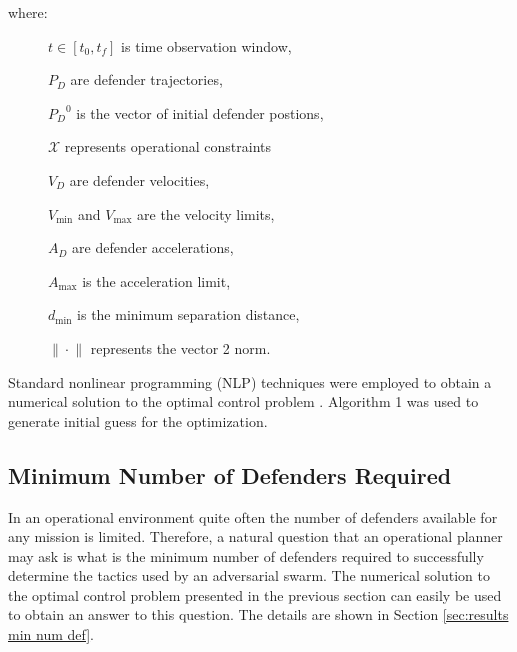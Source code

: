 \documentclass[journal]{IEEEtran} %
\begin{document}
where:

\begin{description}
    \item[] \( t \in [t_0, t_f] \) is time observation window,
    \item[] \( P_D \) are defender trajectories,
    \item[] \( {P_D}^0 \) is the vector of initial defender postions,
    \item[] \( \mathcal{X} \) represents operational constraints
    \item[] \( V_D \) are defender velocities,
    \item[] \( V_{\min} \) and \( V_{\max} \) are the velocity limits,
    \item[] \( A_D \) are defender accelerations,
    \item[] \( A_{\max} \) is the acceleration limit,
    \item[] \( d_{\min} \) is the minimum separation distance,    
    \item[] \( \|\cdot{}\| \) represents the vector 2 norm.
\end{description}
\vspace{\baselineskip}

Standard nonlinear programming (NLP) techniques were employed to obtain a numerical solution to the optimal control problem \cite{nocedal_numerical_2006}. Algorithm 1 was used to generate initial guess for the optimization. 


\subsection{Minimum Number of Defenders Required}


In an operational environment quite often the number of defenders available for any mission is limited. Therefore, a natural question that an operational planner may ask is what is the minimum number of defenders required to successfully determine the tactics used by an adversarial swarm. The numerical solution to the optimal control problem presented in the previous section can easily be used to obtain an answer to this question. The details are shown in Section \ref{sec:results min num def}. 



\end{document}
